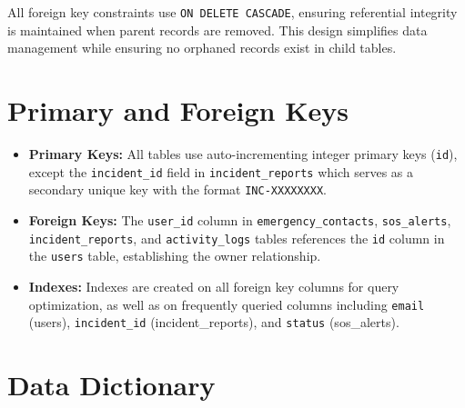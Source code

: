 All foreign key constraints use \texttt{ON DELETE CASCADE}, ensuring referential integrity is maintained when parent records are removed. This design simplifies data management while ensuring no orphaned records exist in child tables.

\section{Primary and Foreign Keys}

\begin{itemize}
  \item \textbf{Primary Keys:} All tables use auto-incrementing integer primary keys (\texttt{id}), except the \texttt{incident\_id} field in \texttt{incident\_reports} which serves as a secondary unique key with the format \texttt{INC-XXXXXXXX}.

  \item \textbf{Foreign Keys:} The \texttt{user\_id} column in \texttt{emergency\_contacts}, \texttt{sos\_alerts}, \texttt{incident\_reports}, and \texttt{activity\_logs} tables references the \texttt{id} column in the \texttt{users} table, establishing the owner relationship.

  \item \textbf{Indexes:} Indexes are created on all foreign key columns for query optimization, as well as on frequently queried columns including \texttt{email} (users), \texttt{incident\_id} (incident\_reports), and \texttt{status} (sos\_alerts).
\end{itemize}

\section{Data Dictionary}

